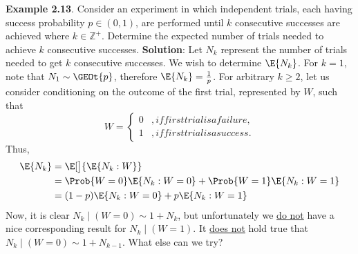 \begin{Example}
    \textbf{Example 2.13}. Consider an experiment in which independent trials, each having success
    probability $ p\in(0,1) $, are performed until $ k $ consecutive successes are achieved where $ k\in\mathbb{Z}^+ $.
    Determine the expected number of trials needed to achieve $ k $ consecutive successes.
    \tcblower{}
    \textbf{Solution}: Let $ N_k $ represent the number of trials needed to get $ k $ consecutive successes.
    We wish to determine $ \E{N_k} $. For $ k=1 $, note that $ N_1 \sim \GEOt{p} $, therefore $ \E{N_k}=\frac{1}{p} $.
    For arbitrary $ k\ge 2 $, let us consider conditioning on the outcome of the first trial, represented by $ W $,
    such that
    \[ W=\begin{cases*}
            0 & , if first trial is a failure, \\
            1 & , if first trial is a success.
        \end{cases*} \]
    Thus,
    \begin{align*}
        \E{N_k}
         & =\E[\big]{\E{N_k\given W}}                                 \\
         & =\Prob{W=0}\E{N_k\given W=0} + \Prob{W=1}\E{N_k\given W=1} \\
         & =(1-p)\E{N_k\given W=0}+p\E{N_k\given W=1}
    \end{align*}
    Now, it is clear $ N_k\mid(W=0) \sim 1+N_k $, but unfortunately
    we \underline{do not} have a nice corresponding result for $ N_k\mid(W=1) $.
    It \underline{does not} hold true that $ N_k\mid (W=0)\sim 1+N_{k-1} $. What else can we try?


\end{Example}
